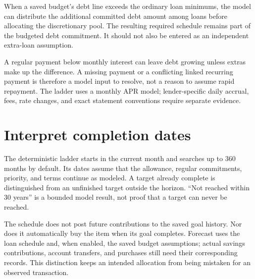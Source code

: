 When a saved budget's debt line exceeds the ordinary loan minimums, the model can distribute the additional committed debt amount among loans before allocating the discretionary pool. The resulting required schedule remains part of the budgeted debt commitment. It should not also be entered as an independent extra-loan assumption.

A regular payment below monthly interest can leave debt growing unless extras make up the difference. A missing payment or a conflicting linked recurring payment is therefore a model input to resolve, not a reason to assume rapid repayment. The ladder uses a monthly APR model; lender-specific daily accrual, fees, rate changes, and exact statement conventions require separate evidence.

\section{Interpret completion dates}
The deterministic ladder starts in the current month and searches up to 360 months by default. Its dates assume that the allowance, regular commitments, priority, and terms continue as modeled. A target already complete is distinguished from an unfinished target outside the horizon. ``Not reached within 30 years'' is a bounded model result, not proof that a target can never be reached.

The schedule does not post future contributions to the saved goal history. Nor does it automatically buy the item when its goal completes. Forecast uses the loan schedule and, when enabled, the saved budget assumptions; actual savings contributions, account transfers, and purchases still need their corresponding records. This distinction keeps an intended allocation from being mistaken for an observed transaction.


